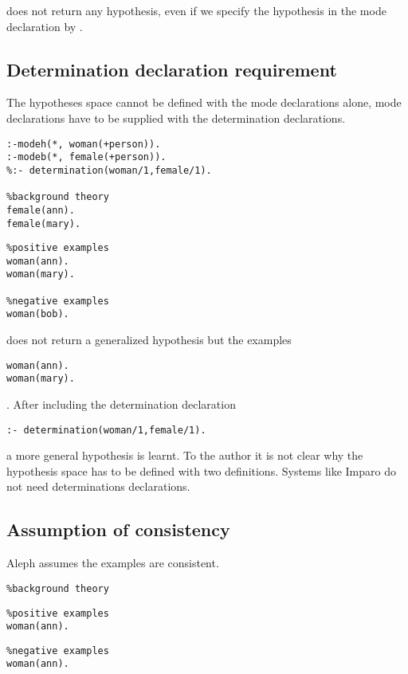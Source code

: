 does not return any hypothesis, even if we specify the hypothesis in the mode declaration by .

\subsection{Determination declaration requirement}
The hypotheses space cannot be defined with the mode declarations alone, mode declarations have to be supplied with the determination declarations.

\begin{minipage}[t]{.50\textwidth}
\begin{lstlisting}
:-modeh(*, woman(+person)).
:-modeb(*, female(+person)).
%:- determination(woman/1,female/1).

%background theory
female(ann).
female(mary).
\end{lstlisting}
\end{minipage}
\begin{minipage}[t]{.30\textwidth}
\begin{lstlisting}
%positive examples
woman(ann).
woman(mary).

%negative examples
woman(bob).
\end{lstlisting}
\end{minipage}

does not return a generalized hypothesis but the examples
\begin{lstlisting}
woman(ann).
woman(mary).
\end{lstlisting}.
After including the determination declaration
\begin{lstlisting}
:- determination(woman/1,female/1).
\end{lstlisting}
a more general hypothesis  is learnt. To the author it is not clear why the hypothesis space has to be defined with two definitions. Systems like Imparo do not need determinations declarations.

\subsection{Assumption of consistency}
Aleph assumes the examples are consistent.

\begin{minipage}[t]{.30\textwidth}
\begin{lstlisting}
%background theory
\end{lstlisting}
\end{minipage}
\begin{minipage}[t]{.30\textwidth}
\begin{lstlisting}
%positive examples
woman(ann).
\end{lstlisting}
\end{minipage}
\begin{minipage}[t]{.30\textwidth}
\begin{lstlisting}
%negative examples
woman(ann).
\end{lstlisting}
\end{minipage}

